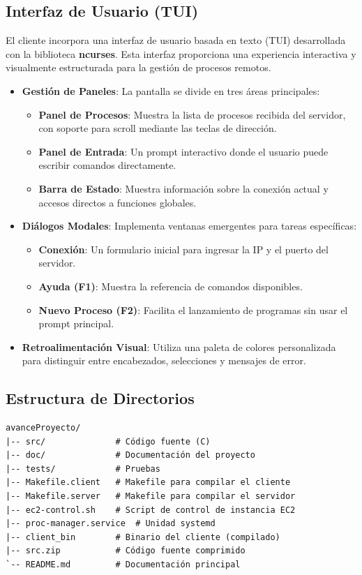 \documentclass[12pt,a4paper]{report}
\begin{document}
\subsection{Interfaz de Usuario (TUI)}

El cliente incorpora una interfaz de usuario basada en texto (TUI) desarrollada con la biblioteca \textbf{ncurses}. Esta interfaz proporciona una experiencia interactiva y visualmente estructurada para la gestión de procesos remotos.

\begin{itemize}[leftmargin=1.5em]
  \item \textbf{Gestión de Paneles}: La pantalla se divide en tres áreas principales:
    \begin{itemize}
      \item \textbf{Panel de Procesos}: Muestra la lista de procesos recibida del servidor, con soporte para scroll mediante las teclas de dirección.
      \item \textbf{Panel de Entrada}: Un prompt interactivo donde el usuario puede escribir comandos directamente.
      \item \textbf{Barra de Estado}: Muestra información sobre la conexión actual y accesos directos a funciones globales.
    \end{itemize}
  \item \textbf{Diálogos Modales}: Implementa ventanas emergentes para tareas específicas:
    \begin{itemize}
      \item \textbf{Conexión}: Un formulario inicial para ingresar la IP y el puerto del servidor.
      \item \textbf{Ayuda (F1)}: Muestra la referencia de comandos disponibles.
      \item \textbf{Nuevo Proceso (F2)}: Facilita el lanzamiento de programas sin usar el prompt principal.
    \end{itemize}
  \item \textbf{Retroalimentación Visual}: Utiliza una paleta de colores personalizada para distinguir entre encabezados, selecciones y mensajes de error.
\end{itemize}

\subsection{Estructura de Directorios}

\begin{tcolorbox}[colback=grisClaro, colframe=gray!40]
\begin{verbatim}
avanceProyecto/
|-- src/              # Código fuente (C)
|-- doc/              # Documentación del proyecto
|-- tests/            # Pruebas
|-- Makefile.client   # Makefile para compilar el cliente
|-- Makefile.server   # Makefile para compilar el servidor
|-- ec2-control.sh    # Script de control de instancia EC2
|-- proc-manager.service  # Unidad systemd
|-- client_bin        # Binario del cliente (compilado)
|-- src.zip           # Código fuente comprimido
`-- README.md         # Documentación principal
\end{verbatim}
\end{tcolorbox}
\end{document}
